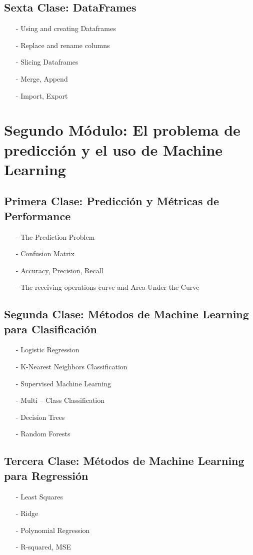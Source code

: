 \documentclass[12pt]{article}
\begin{document}
\subsection*{Sexta Clase: DataFrames}
\begin{itemize}
\item[-]	Using and creating Dataframes
\item[-]	Replace and rename columns
\item[-]	Slicing Dataframes
\item[-]	Merge, Append
\item[-]	Import, Export
\end{itemize}

\section*{Segundo Módulo: El problema de predicción y el uso de Machine Learning}

\subsection*{Primera Clase: Predicción y Métricas de Performance}
\begin{itemize}
\item[-]	The Prediction Problem
\item[-]	Confusion Matrix
\item[-]	Accuracy, Precision, Recall
\item[-]	The receiving operations curve and Area Under the Curve

\end{itemize}

\subsection*{Segunda Clase: Métodos de Machine Learning para Clasificación}
\begin{itemize}
\item[-]	Logistic Regression
\item[-]	K-Nearest Neighbors Classification
\item[-]	Supervised Machine Learning
\item[-]	Multi – Class Classification
\item[-]	Decision Trees
\item[-]	Random Forests
\end{itemize}

\subsection*{Tercera Clase: Métodos de Machine Learning para Regressión}
\begin{itemize}
\item[-]	Least Squares
\item[-]	Ridge
\item[-]	Polynomial Regression
\item[-]	R-squared, MSE
\end{itemize}
\end{document}
